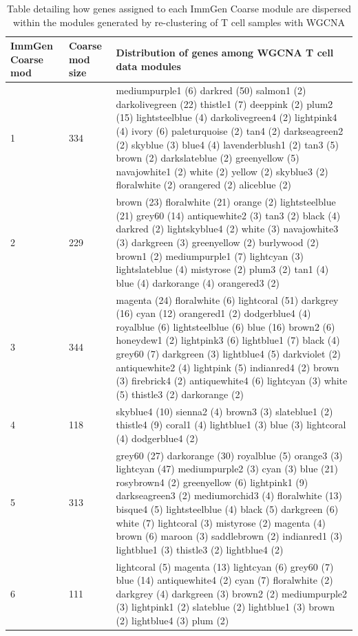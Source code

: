 \begin{landscape}
\small 
\begin{longtable}{|p{1.5cm}|p{1.25cm}|p{21cm}|}
\caption{Table detailing how genes assigned to each ImmGen Coarse module are dispersed within the modules generated by re-clustering of T cell samples with WGCNA}\\
\hline
ImmGen Coarse mod & Coarse mod size & Distribution of genes among WGCNA T cell data modules \\
\hline
1 & 334 & mediumpurple1 (6) darkred (50) salmon1 (2) darkolivegreen (22) thistle1 (7) deeppink (2) plum2 (15) lightsteelblue (4) darkolivegreen4 (2) lightpink4 (4) ivory (6) paleturquoise (2) tan4 (2) darkseagreen2 (2) skyblue (3) blue4 (4) lavenderblush1 (2) tan3 (5) brown (2) darkslateblue (2) greenyellow (5) navajowhite1 (2) white (2) yellow (2) skyblue3 (2) floralwhite (2) orangered (2) aliceblue (2) \\
2 & 229 & brown (23) floralwhite (21) orange (2) lightsteelblue (21) grey60 (14) antiquewhite2 (3) tan3 (2) black (4) darkred (2) lightskyblue4 (2) white (3) navajowhite3 (3) darkgreen (3) greenyellow (2) burlywood (2) brown1 (2) mediumpurple1 (7) lightcyan (3) lightslateblue (4) mistyrose (2) plum3 (2) tan1 (4) blue (4) darkorange (4) orangered3 (2) \\
3 & 344 & magenta (24) floralwhite (6) lightcoral (51) darkgrey (16) cyan (12) orangered1 (2) dodgerblue4 (4) royalblue (6) lightsteelblue (6) blue (16) brown2 (6) honeydew1 (2) lightpink3 (6) lightblue1 (7) black (4) grey60 (7) darkgreen (3) lightblue4 (5) darkviolet (2) antiquewhite2 (4) lightpink (5) indianred4 (2) brown (3) firebrick4 (2) antiquewhite4 (6) lightcyan (3) white (5) thistle3 (2) darkorange (2) \\
4 & 118 & skyblue4 (10) sienna2 (4) brown3 (3) slateblue1 (2) thistle4 (9) coral1 (4) lightblue1 (3) blue (3) lightcoral (4) dodgerblue4 (2) \\
5 & 313 & grey60 (27) darkorange (30) royalblue (5) orange3 (3) lightcyan (47) mediumpurple2 (3) cyan (3) blue (21) rosybrown4 (2) greenyellow (6) lightpink1 (9) darkseagreen3 (2) mediumorchid3 (4) floralwhite (13) bisque4 (5) lightsteelblue (4) black (5) darkgreen (6) white (7) lightcoral (3) mistyrose (2) magenta (4) brown (6) maroon (3) saddlebrown (2) indianred1 (3) lightblue1 (3) thistle3 (2) lightblue4 (2) \\
6 & 111 & lightcoral (5) magenta (13) lightcyan (6) grey60 (7) blue (14) antiquewhite4 (2) cyan (7) floralwhite (2) darkgrey (4) darkgreen (3) brown2 (2) mediumpurple2 (3) lightpink1 (2) slateblue (2) lightblue1 (3) brown (2) lightblue4 (3) plum (2) \\

\end{longtable}
\end{landscape}
